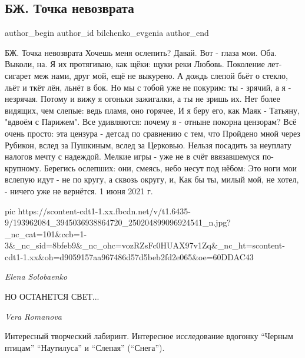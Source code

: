  
 
 
 
 
 
\subsection{БЖ. Точка невозврата}
\label{sec:01_06_2021.fb.bilchenko_evgenia.2.tochka_nevozvrata}
\ifcmt
 author_begin
   author_id bilchenko_evgenia
 author_end
\fi

БЖ. Точка невозврата
Хочешь меня ослепить? Давай. Вот - глаза мои. Оба. Выколи, на.
Я их протягиваю, как щёки: щуки реки Любовь.
Поколение лет-сигарет меж нами, друг мой, ещё не выкурено.
А дождь слепой бьёт о стекло, льёт и ткёт лён, льнёт в бок.
Но мы с тобой уже не покурим: ты - зрячий, а я - незрячая.
Потому и вижу я огоньки зажигалки, а ты не зришь их.
Нет более видящих, чем слепые: ведь пламя, оно горячее,
И я беру его, как Маяк - Татьяну, "вдвоём с Парижем".
Все удивляются: почему я - отныне покорна цензорам?
Всё очень просто: эта цензура - детсад по сравнению с тем, что
Пройдено мной через Рубикон, вслед за Пушкиным, вслед за Церковью.
Нельзя посадить за неуплату налогов мечту с надеждой.
Мелкие игры - уже не в счёт ввязавшемуся по-крупному.
Берегись ослепших: они, смеясь, небо несут под нёбом:
Это ноги мои вслепую идут - не по кругу, а сквозь округу, и,
Как бы ты, милый мой, не хотел, - ничего уже не вернётся.
1 июня 2021 г.

\ifcmt
  pic https://scontent-cdt1-1.xx.fbcdn.net/v/t1.6435-9/193962084_3945036938864720_250204899096924541_n.jpg?_nc_cat=101&ccb=1-3&_nc_sid=8bfeb9&_nc_ohc=vozRZsFc0HUAX97v1Zq&_nc_ht=scontent-cdt1-1.xx&oh=d9059157aa967486d57d5beb2fd2e065&oe=60DDAC43
\fi

\emph{Elena Solobaenko}

НО ОСТАНЕТСЯ СВЕТ...

\emph{Vera Romanova}

Интересный творческий лабиринт. Интересное исследование вдогонку
\enquote{Черным птицам} \enquote{Наутилуса} и \enquote{Слепая}
(\enquote{Снега}).

